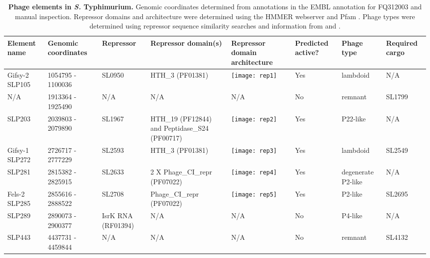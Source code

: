 %
\begin{table}
   \tiny
   \centering
   \noindent
    \caption[Phage elements in {\it S.} Typhimurium]{\textbf{Phage elements in {\it S.} Typhimurium.} Genomic coordinates determined from annotations in the EMBL annotation for FQ312003 and manual inspection. Repressor domains and architecture were determined using the HMMER webserver \parencite{Finn2011} and Pfam \parencite{Punta2012}. Phage types were determined using repressor sequence similarity searches and information from \textcite{Thomson2004} and \textcite{Kropinski2007}. }
    \begin{tabular}{     m{0.5in}
    				m{0.4in}
				m{0.4in}
				m{0.6in}
				m{1.6in}
				m{0.4in}
				m{0.5in}
				m{0.5in}
				}
   
    \\
     \toprule
    \textbf{Element name} & \textbf{Genomic coordinates} & \textbf{Repressor} & \textbf{Repressor domain(s)} & \textbf{Repressor domain architecture} & \textbf{Predicted active?} & \textbf{Phage type} & \textbf{Required cargo} \\
    \midrule
    Gifsy-2 SLP105 & 1054795 - 1100036 & SL0950 & HTH\_3 (PF01381) &\texttt{[image: rep1]}& Yes   & lambdoid & N/A \\
    N/A   & 1913364 - 1925490 & N/A   & N/A   & N/A   & No    & remnant & SL1799 \\
    SLP203 & 2039803 - 2079890 & SL1967 & HTH\_19 (PF12844) and Peptidase\_S24 (PF00717) &\texttt{[image: rep2]}& Yes   & P22-like & N/A \\
    Gifsy-1 SLP272 & 2726717 - 2777229 & SL2593 & HTH\_3 (PF01381) &    \texttt{[image: rep3]}   & Yes   & lambdoid & SL2549 \\
    SLP281 & 2815382 - 2825915 & SL2633 & 2 X Phage\_CI\_repr (PF07022) &   \texttt{[image: rep4]}    & Yes   & degenerate P2-like & N/A \\
    Fels-2 SLP285 & 2855616 - 2888522 & SL2708 & Phage\_CI\_repr (PF07022) &   \texttt{[image: rep5]}    & Yes   & P2-like & SL2695 \\
    SLP289 & 2890073 - 2900377 & IsrK RNA (RF01394) & N/A   & N/A   & No    & P4-like & N/A \\
    SLP443 & 4437731 - 4459844 & N/A   & N/A   & N/A   & No    & remnant & SL4132 \\
    \bottomrule    
    \end{tabular}%
    \label{tab:stm_phage}%
\end{table}

